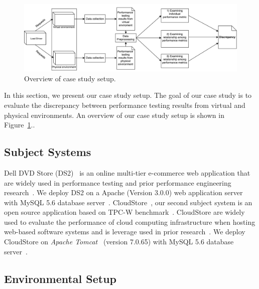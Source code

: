 
\begin{figure}[thb]
	\includegraphics[width=.9\textwidth]{figures/overview}
	\caption{Overview of case study setup.}
	\label{fig:Approach}
\end{figure}

In this section, we present our case study setup. The goal of our case study is to evaluate the discrepancy between performance testing results from virtual and physical environments. An overview of our case study setup is shown in Figure~\ref{fig:Approach}..


\subsection{Subject Systems}
Dell DVD Store (DS2)~\cite{delldvd} is an online multi-tier e-commerce web application that are widely used in performance testing and prior performance engineering research~\cite{Shang:2015:ADP:2668930.2688052,Nguyen:2012:ADP:2188286.2188344, jackicsm2009}. We deploy DS2 on a Apache (Version 3.0.0) web application server with MySQL 5.6 database server~\cite{mysql}. CloudStore~\cite{cloudstore}, our second subject system is an open source application based on TPC-W benchmark~\cite{tpcw}. CloudStore are widely used to evaluate the performance of cloud computing infrastructure when hosting web-based software systems and is leverage used in prior research~\cite{tarekmsr16}. We deploy CloudStore on \textit{Apache Tomcat}~\cite{tomcat} (version 7.0.65) with MySQL 5.6 database server~\cite{mysql}. 


\subsection{Environmental Setup}

